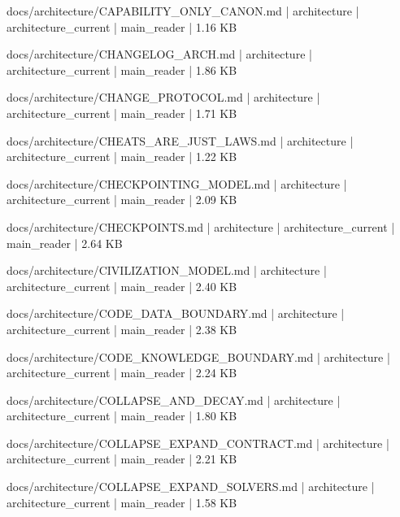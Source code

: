 \documentclass[11pt,a4paper]{report}
\begin{document}
{\small\ttfamily\raggedright docs/\allowbreak{}architecture/\allowbreak{}CAPABILITY\_ONLY\_CANON.\allowbreak{}md | architecture | architecture\_current | main\_reader | 1.\allowbreak{}16 KB\par}
{\small\ttfamily\raggedright docs/\allowbreak{}architecture/\allowbreak{}CHANGELOG\_ARCH.\allowbreak{}md | architecture | architecture\_current | main\_reader | 1.\allowbreak{}86 KB\par}
{\small\ttfamily\raggedright docs/\allowbreak{}architecture/\allowbreak{}CHANGE\_PROTOCOL.\allowbreak{}md | architecture | architecture\_current | main\_reader | 1.\allowbreak{}71 KB\par}
{\small\ttfamily\raggedright docs/\allowbreak{}architecture/\allowbreak{}CHEATS\_ARE\_JUST\_LAWS.\allowbreak{}md | architecture | architecture\_current | main\_reader | 1.\allowbreak{}22 KB\par}
{\small\ttfamily\raggedright docs/\allowbreak{}architecture/\allowbreak{}CHECKPOINTING\_MODEL.\allowbreak{}md | architecture | architecture\_current | main\_reader | 2.\allowbreak{}09 KB\par}
{\small\ttfamily\raggedright docs/\allowbreak{}architecture/\allowbreak{}CHECKPOINTS.\allowbreak{}md | architecture | architecture\_current | main\_reader | 2.\allowbreak{}64 KB\par}
{\small\ttfamily\raggedright docs/\allowbreak{}architecture/\allowbreak{}CIVILIZATION\_MODEL.\allowbreak{}md | architecture | architecture\_current | main\_reader | 2.\allowbreak{}40 KB\par}
{\small\ttfamily\raggedright docs/\allowbreak{}architecture/\allowbreak{}CODE\_DATA\_BOUNDARY.\allowbreak{}md | architecture | architecture\_current | main\_reader | 2.\allowbreak{}38 KB\par}
{\small\ttfamily\raggedright docs/\allowbreak{}architecture/\allowbreak{}CODE\_KNOWLEDGE\_BOUNDARY.\allowbreak{}md | architecture | architecture\_current | main\_reader | 2.\allowbreak{}24 KB\par}
{\small\ttfamily\raggedright docs/\allowbreak{}architecture/\allowbreak{}COLLAPSE\_AND\_DECAY.\allowbreak{}md | architecture | architecture\_current | main\_reader | 1.\allowbreak{}80 KB\par}
{\small\ttfamily\raggedright docs/\allowbreak{}architecture/\allowbreak{}COLLAPSE\_EXPAND\_CONTRACT.\allowbreak{}md | architecture | architecture\_current | main\_reader | 2.\allowbreak{}21 KB\par}
{\small\ttfamily\raggedright docs/\allowbreak{}architecture/\allowbreak{}COLLAPSE\_EXPAND\_SOLVERS.\allowbreak{}md | architecture | architecture\_current | main\_reader | 1.\allowbreak{}58 KB\par}
\end{document}
